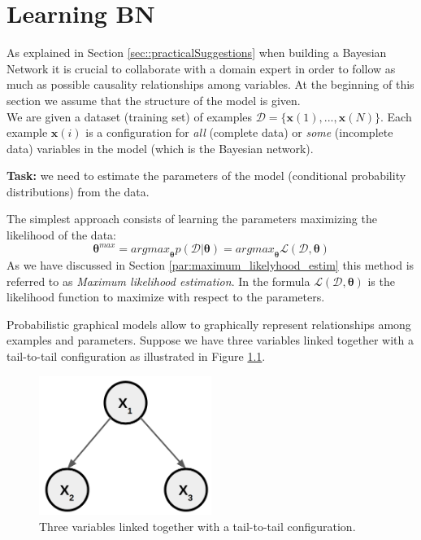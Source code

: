 \chapter{Learning BN}
\label{cha:learning_BN}
As explained in Section \ref{sec::practicalSuggestions} when building a Bayesian Network it is crucial to collaborate with a domain expert in order to follow as much as possible causality relationships among variables. At the beginning of this section we assume that the structure of the model is given.\\
We are given a dataset (training set) of examples $\mathcal{D} = \{\pmb{x}(1), ..., \pmb{x}(N)\}$. Each example $\pmb{x}(i)$ is a configuration for \textit{all} (complete data) or \textit{some} (incomplete data) variables in the model (which is the Bayesian network). \newline

\textbf{Task:} we need to estimate the parameters of the model (conditional probability distributions) from the data. \newline

The simplest approach consists of learning the parameters maximizing the likelihood of the data:
$${\pmb{\theta}}^{\mathit{max}} = {\mathit{argmax}}_{\pmb{\theta}} p(\mathcal{D}|\pmb{\theta}) = \mathit{argmax}_{\pmb{\theta}} \mathcal{L} (\mathcal{D}, \pmb{\theta})$$
As we have discussed in Section \ref{par:maximum_likelyhood_estim} this method is referred to as \textit{Maximum likelihood estimation}. In the formula $\mathcal{L} (\mathcal{D}, \pmb{\theta})$ is the likelihood function to maximize with respect to the parameters. \newline

Probabilistic graphical models allow to graphically represent relationships among examples and parameters. Suppose we have three variables linked together with a tail-to-tail configuration as illustrated in Figure \ref{fig:tailToTailLearningBN}. 

\begin{figure}[h]
    \centering
    \includegraphics[width=0.5\textwidth]{images/tailToTailLearningBN.png}
    \caption{Three variables linked together with a tail-to-tail configuration.}
    \label{fig:tailToTailLearningBN}
\end{figure}

